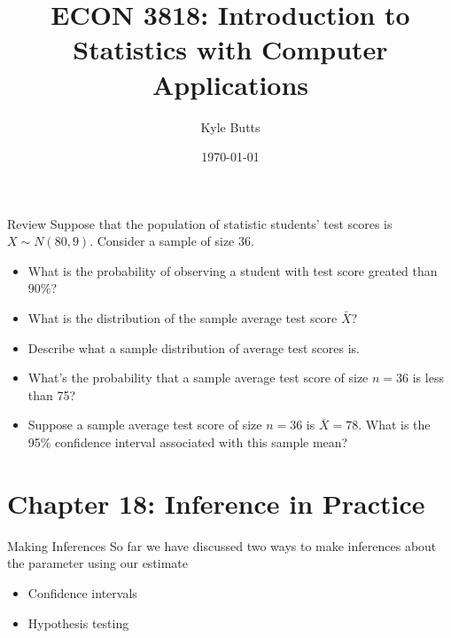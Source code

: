 \documentclass{beamer}
\title{ECON 3818: Introduction to Statistics with Computer Applications}
\date{\today}
\author{Kyle Butts}
\begin{document}
\maketitle



\begin{frame}{Review}
	Suppose that the population of statistic students' test scores is $X \sim N(80, 9)$. Consider a sample of size 36.

	\begin{itemize}
		\item What is the probability of observing a student with test score greated than $90\%$?
		
		\item What is the distribution of the sample average test score $\bar{X}$? 

		\item Describe what a sample distribution of average test scores is.
		
		\item What's the probability that a sample average test score of size $n = 36$ is less than 75?		
		
		\item Suppose a sample average test score of size $n = 36$ is $\bar{X} = 78$. What is the 95\% confidence interval associated with this sample mean?
	\end{itemize}

\end{frame}

\begin{frame}
\end{frame}

\begin{frame}
\end{frame}


\section{Chapter 18: Inference in Practice}

\begin{frame}{Making Inferences}
	So far we have discussed two ways to make inferences about the parameter using our estimate 
	\begin{itemize}
		\item Confidence intervals
		\item Hypothesis testing
	\end{itemize}
\end{frame}
\end{document}
